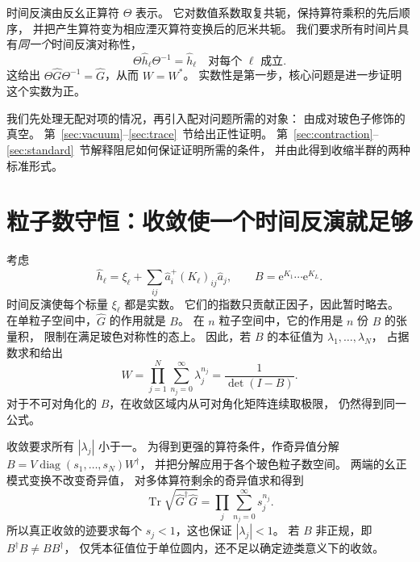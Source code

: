 \documentclass[UTF8,11pt,a4paper,fontset=fandol]{ctexart}
\newcommand{\Tr}{\operatorname{Tr}}
\newcommand{\diag}{\operatorname{diag}}
\newcommand{\ee}{\mathrm e}
\numberwithin{equation}{section}
\begin{document}
时间反演由反幺正算符 $\Theta$ 表示。
它对数值系数取复共轭，保持算符乘积的先后顺序，
并把产生算符变为相应湮灭算符变换后的厄米共轭。
我们要求所有时间片具有\emph{同一个}时间反演对称性，
\begin{equation}
 \Theta\hat h_\ell\Theta^{-1}=\hat h_\ell
 \quad\text{对每个 }\ell\text{ 成立}.
 \label{eq:slice_trs}
\end{equation}
这给出 $\Theta\hat G\Theta^{-1}=\hat G$，从而 $W=W^*$。
实数性是第一步，核心问题是进一步证明这个实数为正。

我们先处理无配对项的情况，再引入配对问题所需的对象：
由成对玻色子修饰的真空。
第~\ref{sec:vacuum}--\ref{sec:trace}~节给出正性证明。
第~\ref{sec:contraction}--\ref{sec:standard}~节解释阻尼如何保证证明所需的条件，
并由此得到收缩半群的两种标准形式。

\section{粒子数守恒：收敛使一个时间反演就足够}
\label{sec:number}

考虑
\begin{equation}
 \hat h_\ell=\xi_\ell+
 \sum_{ij}\hat a_i^+(K_\ell)_{ij}\hat a_j,
 \qquad B=\ee^{K_1}\cdots\ee^{K_L}.
 \label{eq:number_generator}
\end{equation}
时间反演使每个标量 $\xi_\ell$ 都是实数。
它们的指数只贡献正因子，因此暂时略去。
在单粒子空间中，$\hat G$ 的作用就是 $B$。
在 $n$ 粒子空间中，它的作用是 $n$ 份 $B$ 的张量积，
限制在满足玻色对称性的态上。
因此，若 $B$ 的本征值为 $\lambda_1,\ldots,\lambda_N$，
占据数求和给出
\begin{equation}
 W=\prod_{j=1}^{N}\sum_{n_j=0}^{\infty}\lambda_j^{n_j}
   =\frac{1}{\det(I-B)}.
 \label{eq:number_trace}
\end{equation}
对于不可对角化的 $B$，在收敛区域内从可对角化矩阵连续取极限，
仍然得到同一公式。

收敛要求所有 $|\lambda_j|$ 小于一。
为得到更强的算符条件，作奇异值分解
$B=V\diag(s_1,\ldots,s_N)W^\dagger$，
并把分解应用于各个玻色粒子数空间。
两端的幺正模式变换不改变奇异值，
对多体算符剩余的奇异值求和得到
\begin{equation}
 \Tr\sqrt{\hat G^\dagger\hat G}
 =\prod_j\sum_{n_j=0}^{\infty}s_j^{n_j}.
 \label{eq:number_singular}
\end{equation}
所以真正收敛的迹要求每个 $s_j<1$，这也保证 $|\lambda_j|<1$。
若 $B$ 非正规，即 $B^\dagger B\ne BB^\dagger$，
仅凭本征值位于单位圆内，还不足以确定迹类意义下的收敛。
\end{document}
